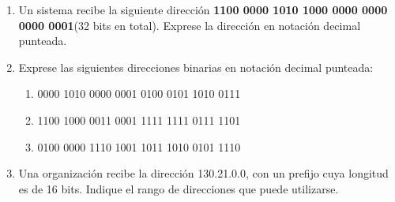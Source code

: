 \documentclass[12pt]{article}
\begin{document}
\begin{enumerate}

    \item Un sistema recibe la siguiente dirección \textbf{1100 0000 1010 1000
        0000 0000 0000 0001}(32 bits en total). Exprese la dirección en
        notación decimal punteada.

    \item Exprese las siguientes direcciones binarias en notación decimal
        punteada:

    \begin{enumerate}

        \item 0000 1010 0000 0001 0100 0101 1010 0111

        \item 1100 1000 0011 0001 1111 1111 0111 1101

        \item 0100 0000 1110 1001 1011 1010 0101 1110

    \end{enumerate}

    \item Una organización recibe la dirección 130.21.0.0, con un prefijo cuya
        longitud es de 16 bits. Indique el rango de direcciones que puede
        utilizarse.

%
%
%
%
%
%
%
%
%
%
%
%
%
\end{enumerate}
\end{document}
